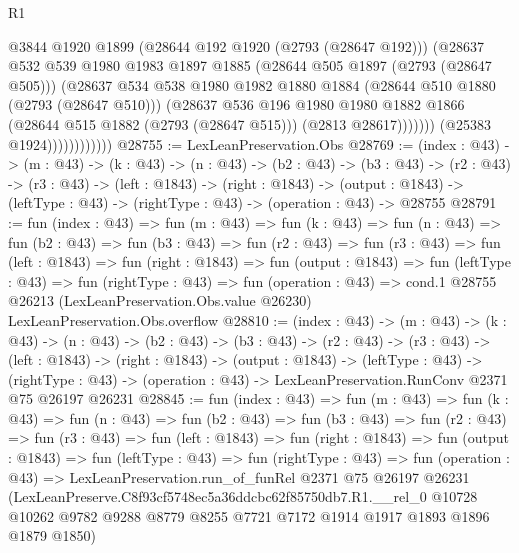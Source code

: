 \begin{lexlean}{R1}
\begin{coremodule}
                                @3844
                                @1920
                                @1899
                                (@28644 @192 @1920 (@2793 (@28647 @192)))
                                (@28637
                                  @532
                                  @539
                                  @1980
                                  @1983
                                  @1897
                                  @1885
                                  (@28644 @505 @1897 (@2793 (@28647 @505)))
                                  (@28637
                                    @534
                                    @538
                                    @1980
                                    @1982
                                    @1880
                                    @1884
                                    (@28644 @510 @1880 (@2793 (@28647 @510)))
                                    (@28637
                                      @536
                                      @196
                                      @1980
                                      @1980
                                      @1882
                                      @1866
                                      (@28644 @515 @1882 (@2793 (@28647 @515)))
                                      (@2813 @28617)))))))
                          (@25383 @1924))))))))))))
@28755 := LexLeanPreservation.Obs
@28769 := (index : @43) ->
  (m : @43) ->
  (k : @43) ->
  (n : @43) ->
  (b2 : @43) ->
  (b3 : @43) ->
  (r2 : @43) ->
  (r3 : @43) ->
  (left : @1843) ->
  (right : @1843) ->
  (output : @1843) -> (leftType : @43) -> (rightType : @43) -> (operation : @43) -> @28755
@28791 := fun (index : @43) =>
  fun (m : @43) =>
  fun (k : @43) =>
  fun (n : @43) =>
  fun (b2 : @43) =>
  fun (b3 : @43) =>
  fun (r2 : @43) =>
  fun (r3 : @43) =>
  fun (left : @1843) =>
  fun (right : @1843) =>
  fun (output : @1843) =>
  fun (leftType : @43) =>
  fun (rightType : @43) =>
  fun (operation : @43) =>
  cond.{1} @28755 @26213 (LexLeanPreservation.Obs.value @26230) LexLeanPreservation.Obs.overflow
@28810 := (index : @43) ->
  (m : @43) ->
  (k : @43) ->
  (n : @43) ->
  (b2 : @43) ->
  (b3 : @43) ->
  (r2 : @43) ->
  (r3 : @43) ->
  (left : @1843) ->
  (right : @1843) ->
  (output : @1843) ->
  (leftType : @43) ->
  (rightType : @43) -> (operation : @43) -> LexLeanPreservation.RunConv @2371 @75 @26197 @26231
@28845 := fun (index : @43) =>
  fun (m : @43) =>
  fun (k : @43) =>
  fun (n : @43) =>
  fun (b2 : @43) =>
  fun (b3 : @43) =>
  fun (r2 : @43) =>
  fun (r3 : @43) =>
  fun (left : @1843) =>
  fun (right : @1843) =>
  fun (output : @1843) =>
  fun (leftType : @43) =>
  fun (rightType : @43) =>
  fun (operation : @43) =>
  LexLeanPreservation.run_of_funRel
    @2371
    @75
    @26197
    @26231
    (LexLeanPreserve.C8f93cf5748ec5a36ddcbc62f85750db7.R1.__rel_0
      @10728
      @10262
      @9782
      @9288
      @8779
      @8255
      @7721
      @7172
      @1914
      @1917
      @1893
      @1896
      @1879
      @1850)
\end{coremodule}
\end{lexlean}
